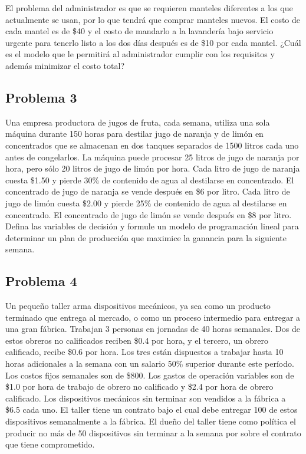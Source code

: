 \documentclass[letterpaper]{article}
\begin{document}
El problema del administrador es que se requieren manteles diferentes a los que actualmente se usan, por lo que tendrá que comprar manteles nuevos. El costo de cada mantel es de \$40 y el costo de mandarlo a la lavandería bajo servicio urgente para tenerlo listo a los dos días después es de \$10 por cada mantel. ¿Cuál es el modelo que le permitirá al administrador cumplir con los
requisitos y además minimizar el costo total?

\subsection*{Problema 3}
Una empresa productora de jugos de fruta, cada semana, utiliza una sola máquina durante 150 horas para destilar jugo de naranja y de limón en concentrados que se almacenan en dos tanques separados de 1500 litros cada uno antes de congelarlos. La máquina puede
procesar 25 litros de jugo de naranja por hora, pero sólo 20 litros de jugo de limón por hora. Cada litro de jugo de naranja cuesta \$1.50 y pierde 30\% de contenido de agua al destilarse en concentrado. El concentrado de jugo de naranja se vende después en \$6 por litro. Cada litro de jugo de limón cuesta \$2.00 y pierde 25\% de contenido de agua al destilarse en concentrado. El concentrado de jugo de limón se vende después en \$8 por litro. Defina las variables de decisión y formule un modelo de programación lineal para determinar un plan de producción que maximice la ganancia para la siguiente semana.

\subsection*{Problema 4}
Un pequeño taller arma dispositivos mecánicos, ya sea como un producto terminado que entrega al mercado, o como un proceso intermedio para entregar a una gran fábrica. Trabajan 3 personas en jornadas de 40 horas semanales. Dos de estos obreros no calificados reciben \$0.4 por hora, y el tercero, un obrero calificado, recibe \$0.6 por hora. Los tres están dispuestos a trabajar hasta 10 horas adicionales a la semana con un salario 50\% superior durante este período. Los costos fijos semanales son de \$800. Los gastos de operación variables son de \$1.0 por hora de trabajo de obrero no calificado y \$2.4 por hora de obrero calificado. Los dispositivos mecánicos sin terminar son vendidos a la fábrica a \$6.5 cada uno. El taller tiene un contrato bajo el cual debe entregar 100 de estos dispositivos semanalmente a la fábrica. El dueño del taller tiene como política el producir no más de 50 dispositivos sin terminar a la semana por sobre el contrato que tiene comprometido.
\end{document}
